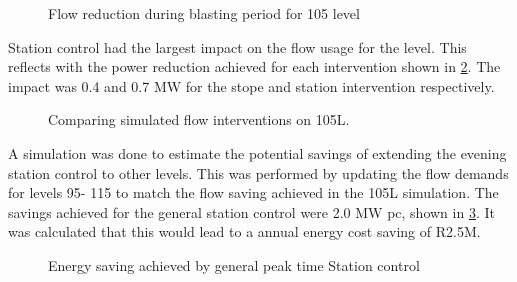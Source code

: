 	\begin{figure}[h!]
		\centering
		
		\caption{Flow reduction during blasting period for 105 level}
		\label{fig: 105 Flow savings}
	\end{figure}
Station control had the largest impact on the flow usage for the level. This reflects with the power reduction achieved for each intervention shown in \cref{fig: Station vs stope}. The impact was 0.4 and 0.7 MW for the stope and station intervention respectively.
	
	\begin{figure}[h!]
		\centering
		
		\caption{Comparing simulated flow interventions on 105L.}
		\label{fig: Station vs stope}
	\end{figure}
A simulation was done to estimate the potential savings of extending the evening station control to other levels. This was performed by updating the flow demands for levels 95- 115 to match the flow saving achieved in the 105L simulation. The savings achieved for the general station control were 2.0 MW \gls{pc}, shown in \cref{fig: General station optimise}. It was calculated that this would lead to a annual energy cost saving of R2.5M.
\begin{figure}[h!]
	\centering
	
	\caption{Energy saving achieved by general peak time Station control }
	\label{fig: General station optimise}
\end{figure}

